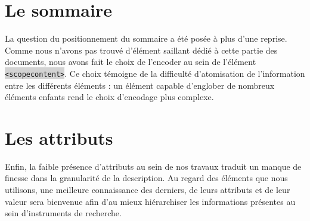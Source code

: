 \documentclass[hidelinks, 13pt]{report}
\newcommand{\code}[1]{\colorbox{LightGray}{\texttt{#1}}}
\begin{document}
	\section{Le sommaire}

	La question du positionnement du sommaire a été posée à plus d'une reprise. Comme nous n'avons pas trouvé d'élément saillant dédié à cette partie des documents, nous avons fait le choix de l'encoder au sein de l'élément \code{<scopecontent>}. Ce choix témoigne de la difficulté d'atomisation de l'information entre les différents éléments : un élément capable d’englober de nombreux éléments enfants rend le choix d’encodage plus complexe.
	
	\section{Les attributs}
	
	Enfin, la faible présence d'attributs au sein de nos travaux traduit un manque de finesse dans la granularité de la description. Au regard des éléments que nous utilisons, une meilleure connaissance des derniers, de leurs attributs et de leur valeur sera bienvenue afin d'au mieux hiérarchiser les informations présentes au sein d'instruments de recherche.
\end{document}
